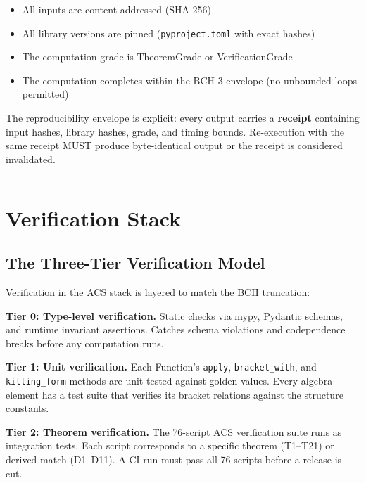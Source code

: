 \documentclass[11pt,a4paper]{article}
\providecommand{\tightlist}{\setlength{\itemsep}{0pt}\setlength{\parskip}{0pt}}
\begin{document}
\begin{itemize}
\tightlist
\item
  All inputs are content-addressed (SHA-256)
\item
  All library versions are pinned (\texttt{pyproject.toml} with exact
  hashes)
\item
  The computation grade is TheoremGrade or VerificationGrade
\item
  The computation completes within the BCH-3 envelope (no unbounded
  loops permitted)
\end{itemize}

The reproducibility envelope is explicit: every output carries a
\textbf{receipt} containing input hashes, library hashes, grade, and
timing bounds. Re-execution with the same receipt MUST produce
byte-identical output or the receipt is considered invalidated.

\begin{center}\rule{0.5\linewidth}{0.5pt}\end{center}

\hypertarget{verification-stack}{%
\section{Verification Stack}\label{verification-stack}}

\hypertarget{the-three-tier-verification-model}{%
\subsection{The Three-Tier Verification
Model}\label{the-three-tier-verification-model}}

Verification in the ACS stack is layered to match the BCH truncation:

\textbf{Tier 0: Type-level verification.} Static checks via mypy,
Pydantic schemas, and runtime invariant assertions. Catches schema
violations and codependence breaks before any computation runs.

\textbf{Tier 1: Unit verification.} Each Function's \texttt{apply},
\texttt{bracket\_with}, and \texttt{killing\_form} methods are
unit-tested against golden values. Every algebra element has a test
suite that verifies its bracket relations against the structure
constants.

\textbf{Tier 2: Theorem verification.} The 76-script ACS verification
suite runs as integration tests. Each script corresponds to a specific
theorem (T1--T21) or derived match (D1--D11). A CI run must pass all 76
scripts before a release is cut.
\end{document}
